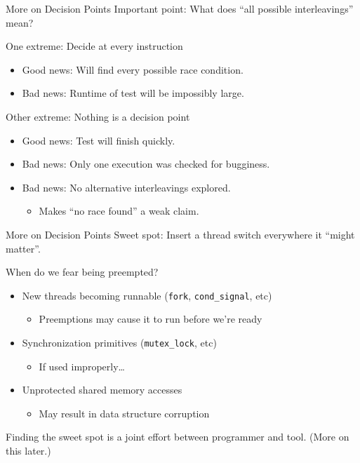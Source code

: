\documentclass[xcolor=dvipsnames]{beamer}
\begin{document}
\begin{frame}{More on Decision Points}
	Important point: What does ``all possible interleavings'' mean?

	\linegap
	One extreme: Decide at every instruction
	\begin{itemize}
		\item Good news: Will find every possible race condition.
		\item Bad news: Runtime of test will be impossibly large.
	\end{itemize}
	\linegap

	Other extreme: Nothing is a decision point
	\begin{itemize}
		\item Good news: Test will finish quickly.
		\item Bad news: Only one execution was checked for bugginess.
		\item Bad news: No alternative interleavings explored.
		\begin{itemize}
			\item Makes ``no race found'' a weak claim.
		\end{itemize}
	\end{itemize}
\end{frame}

\begin{frame}{More on Decision Points}
	Sweet spot: Insert a thread switch everywhere it ``might matter''.

	\linegap
	When do we fear being preempted?
	\begin{itemize}
		\item New threads becoming runnable (\texttt{fork}, \texttt{cond\_signal}, etc)
			\begin{itemize}
				\item Preemptions may cause it to run before we're ready
			\end{itemize}
		\item Synchronization primitives (\texttt{mutex\_lock}, etc)
			\begin{itemize}
				\item If used improperly\ldots
			\end{itemize}
		\item Unprotected shared memory accesses %
			\begin{itemize}
				\item May result in data structure corruption
			\end{itemize}
	\end{itemize}
	\linegap

	Finding the sweet spot is a joint effort between programmer and tool. (More on this later.)
\end{frame}
\end{document}
